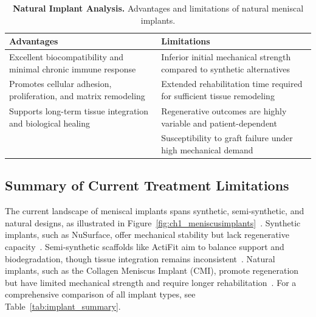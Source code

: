 \begin{table}[H]
\centering
\setlength{\tabcolsep}{8pt}
\begin{tabular}{|p{5.5cm}|p{5.5cm}|}
\hline
\rowcolor{gray!20}
\textbf{Advantages} & \textbf{Limitations} \\ \hline
Excellent biocompatibility and minimal chronic immune response & Inferior initial mechanical strength compared to synthetic alternatives \\ \hline
Promotes cellular adhesion, proliferation, and matrix remodeling & Extended rehabilitation time required for sufficient tissue remodeling \\ \hline
Supports long-term tissue integration and biological healing & Regenerative outcomes are highly variable and patient-dependent \\ \hline
\multicolumn{1}{|c|}{} & Susceptibility to graft failure under high mechanical demand \\ \hline
\end{tabular}
\caption[Natural Implant Analysis]{\textbf{Natural Implant Analysis.} Advantages and limitations of natural meniscal implants.}
\label{tab:natural_implants}\end{table}

\newpage
\subsection{Summary of Current Treatment Limitations}

The current landscape of meniscal implants spans synthetic, semi-synthetic, and natural designs, as illustrated in Figure~\ref{fig:ch1_meniscusimplants}~\cite{sun2017overviewscaffold, gupta2020meniscaltissue}. Synthetic implants, such as NuSurface, offer mechanical stability but lack regenerative capacity~\cite{ghodbane2019partialmeniscus, kwon2019surgicaltissue}. Semi-synthetic scaffolds like ActiFit aim to balance support and biodegradation, though tissue integration remains inconsistent~\cite{li2024advancedhydrogel, baek2015meniscustissue}. Natural implants, such as the Collagen Meniscus Implant (CMI), promote regeneration but have limited mechanical strength and require longer rehabilitation~\cite{ma2025structurallysophisticated, sun2017overviewscaffold}. For a comprehensive comparison of all implant types, see Table~\ref{tab:implant_summary}.

